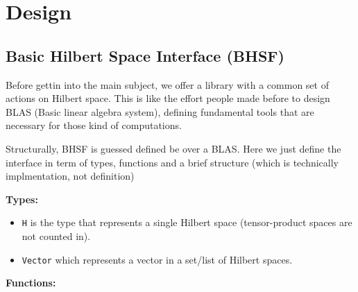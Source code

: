 \documentclass[a4paper,11pt]{article}
\def\co{\lstinline}
\begin{document}
\section{Design}

\subsection{Basic Hilbert Space Interface (BHSF)}

Before gettin into the main subject, we offer a library with a common set of actions on 
Hilbert space.
This is like the effort people made before to design BLAS (Basic linear algebra system),
defining fundamental tools that are necessary for those kind of computations.

Structurally, BHSF is guessed defined be over a BLAS. Here we just define the interface
in term of types, functions and a brief structure (which is technically implmentation, not definition)


\textbf{Types: }
\begin{itemize}
    \item \co|H| is the type that represents a single Hilbert space (tensor-product spaces are not counted in).
	\item \co|Vector| which represents a vector in a set/list of Hilbert spaces.
\end{itemize}

\textbf{Functions: }
\end{document}
